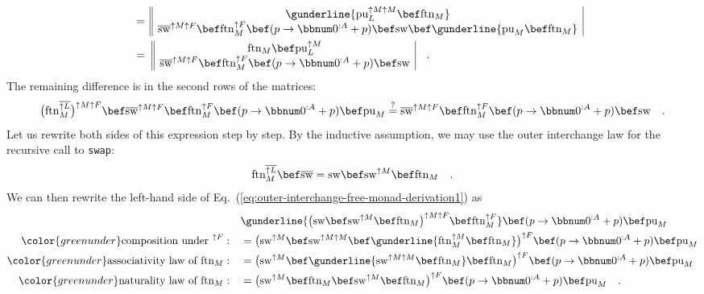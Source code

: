 \begin{align*}
 & \quad=\,\begin{array}{||c|}
\gunderline{\text{pu}_{L}^{\uparrow M\uparrow M}\bef\text{ftn}_{M}}\\
\overline{\text{sw}}^{\uparrow M\uparrow F}\bef\text{ftn}_{M}^{\uparrow F}\bef(p\rightarrow\bbnum 0^{:A}+p)\bef\text{sw}\bef\gunderline{\text{pu}_{M}\bef\text{ftn}_{M}}
\end{array}\\
 & \quad=\,\,\begin{array}{||c|}
\text{ftn}_{M}\bef\text{pu}_{L}^{\uparrow M}\\
\overline{\text{sw}}^{\uparrow M\uparrow F}\bef\text{ftn}_{M}^{\uparrow F}\bef(p\rightarrow\bbnum 0^{:A}+p)\bef\text{sw}
\end{array}\quad.
\end{align*}
The remaining difference is in the second rows of the matrices:
\begin{equation}
\big(\text{ftn}_{M}^{\overline{\uparrow L}}\big)^{\uparrow M\uparrow F}\bef\overline{\text{sw}}^{\uparrow M\uparrow F}\bef\text{ftn}_{M}^{\uparrow F}\bef(p\rightarrow\bbnum 0^{:A}+p)\bef\text{pu}_{M}\overset{?}{=}\overline{\text{sw}}^{\uparrow M\uparrow F}\bef\text{ftn}_{M}^{\uparrow F}\bef(p\rightarrow\bbnum 0^{:A}+p)\bef\text{sw}\quad.\label{eq:outer-interchange-free-monad-derivation1}
\end{equation}
Let us rewrite both sides of this expression step by step. By the
inductive assumption, we may use the outer interchange law for the
recursive call to \lstinline!swap!:
\[
\text{ftn}_{M}^{\overline{\uparrow L}}\bef\overline{\text{sw}}=\text{sw}\bef\text{sw}^{\uparrow M}\bef\text{ftn}_{M}\quad.
\]
We can then rewrite the left-hand side of Eq.~(\ref{eq:outer-interchange-free-monad-derivation1})
as
\begin{align*}
 & \gunderline{\big(\text{sw}\bef\text{sw}^{\uparrow M}\bef\text{ftn}_{M}\big)^{\uparrow M\uparrow F}\bef\text{ftn}_{M}^{\uparrow F}}\bef(p\rightarrow\bbnum 0^{:A}+p)\bef\text{pu}_{M}\\
{\color{greenunder}\text{composition under }^{\uparrow F}:}\quad & =\big(\text{sw}^{\uparrow M}\bef\text{sw}^{\uparrow M\uparrow M}\bef\gunderline{\text{ftn}_{M}^{\uparrow M}\bef\text{ftn}_{M}}\big)^{\uparrow F}\bef(p\rightarrow\bbnum 0^{:A}+p)\bef\text{pu}_{M}\\
{\color{greenunder}\text{associativity law of }\text{ftn}_{M}:}\quad & =\big(\text{sw}^{\uparrow M}\bef\gunderline{\text{sw}^{\uparrow M\uparrow M}\bef\text{ftn}_{M}}\bef\text{ftn}_{M}\big)^{\uparrow F}\bef(p\rightarrow\bbnum 0^{:A}+p)\bef\text{pu}_{M}\\
{\color{greenunder}\text{naturality law of }\text{ftn}_{M}:}\quad & =\big(\text{sw}^{\uparrow M}\bef\text{ftn}_{M}\bef\text{sw}^{\uparrow M}\bef\text{ftn}_{M}\big)^{\uparrow F}\bef(p\rightarrow\bbnum 0^{:A}+p)\bef\text{pu}_{M}\quad.
\end{align*}
